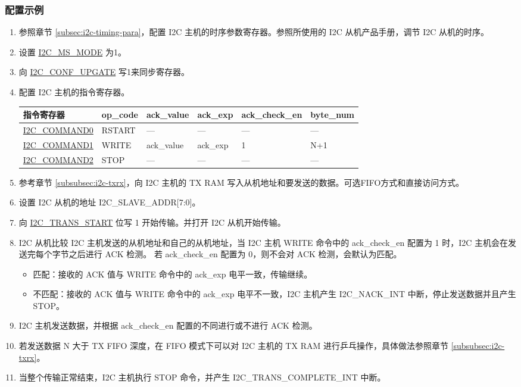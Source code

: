 \documentclass[main\_\_CN.tex]{subfiles}
\begin{document}
\subsubsection{配置示例}
\begin{enumerate}
\item 参照章节 \ref{subsec:i2c-timing-para}，配置 I2C 主机的时序参数寄存器。参照所使用的 I2C 从机产品手册，调节 I2C 从机的时序。
\item 设置 \hyperref[fielddesc:I2CMSMODE]{I2C\_MS\_MODE} 为1。
\item 向 \hyperref[fielddesc:I2CCONFUPGATE]{I2C\_CONF\_UPGATE}
写1来同步寄存器。
\item 配置 I2C 主机的指令寄存器。

\begin{longtable}{ | p{4cm} | p{2cm} | p{2cm} | p{2cm} |p{2cm} | p{2cm} |}
\hline\rowcolor{lightgray}
指令寄存器& op\_code & ack\_value&ack\_exp&ack\_check\_en&byte\_num  \\ \hline
\hyperref[fielddesc:I2CCOMMAND0]{I2C\_COMMAND0} & RSTART& ---&---&---&---  \\ \hline
\hyperref[fielddesc:I2CCOMMAND1]{I2C\_COMMAND1} & WRITE& ack\_value&ack\_exp&1&N+1  \\ \hline
\hyperref[fielddesc:I2CCOMMAND2]{I2C\_COMMAND2} & STOP& ---&---&---&---  \\ \hline
\end{longtable}

\item 参考章节 \ref{subsubsec:i2c-txrx}，向 I2C 主机的 TX RAM 写入从机地址和要发送的数据。可选FIFO方式和直接访问方式。
\item 设置 I2C 从机的地址 I2C\_SLAVE\_ADDR[7:0]。
\item 向 \hyperref[fielddesc:I2CTRANSSTART]{I2C\_TRANS\_START} 位写 1 开始传输。并打开 I2C 从机开始传输。
\item I2C 从机比较 I2C 主机发送的从机地址和自己的从机地址，当 I2C 主机 WRITE 命令中的 ack\_check\_en 配置为 1 时，I2C 主机会在发送完每个字节之后进行 ACK 检测。 若 ack\_check\_en 配置为 0，则不会对 ACK 检测，会默认为匹配。
\begin{itemize}
\item 匹配：接收的 ACK 值与 WRITE 命令中的 ack\_exp 电平一致，传输继续。
\item 不匹配：接收的 ACK 值与 WRITE 命令中的 ack\_exp 电平不一致，I2C 主机产生 I2C\_NACK\_INT 中断，停止发送数据并且产生 STOP。
\end{itemize}

\item I2C 主机发送数据，并根据 ack\_check\_en 配置的不同进行或不进行 ACK 检测。
\item 若发送数据 N 大于 TX FIFO 深度，在 FIFO 模式下可以对 I2C 主机的 TX RAM 进行乒乓操作，具体做法参照章节 \ref{subsubsec:i2c-txrx}。

\item 当整个传输正常结束，I2C 主机执行 STOP 命令，并产生 I2C\_TRANS\_COMPLETE\_INT  中断。

\end{enumerate}
\end{document}
